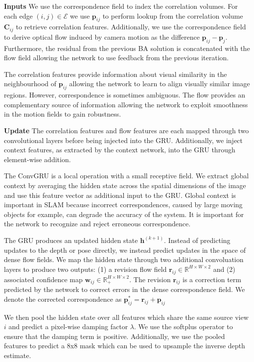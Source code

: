 \documentclass{article}
\begin{document}
\noindent \textbf{Inputs} We use the correspondence field to index the correlation volumes. For each edge $(i,j) \in \mathcal{E}$ we use $\mathbf{p}_{ij}$ to perform lookup from the correlation volume $\mathbf{C}_{ij}$ to retrieve correlation features. Additionally, we use the correspondence field to derive optical flow induced by camera motion as the difference $\mathbf{p}_{ij} - \mathbf{p}_j$. Furthermore, the residual from the previous BA solution is concatenated with the flow field allowing the network to use feedback from the previous iteration.

The correlation features provide information about visual similarity in the neighbourhood of $\mathbf{p}_{ij}$ allowing the network to learn to align visually similar image regions. However, correspondence is sometimes ambiguous. The flow provides an complementary source of information allowing the network to exploit smoothness in the motion fields to gain robustness.

\noindent \textbf{Update} The correlation features and flow features are each mapped through two convolutional layers before being injected into the GRU. Additionally, we inject context features, as extracted by the context network, into the GRU through element-wise addition.

The ConvGRU is a local operation with a small receptive field. We extract global context by averaging the hidden state across the spatial dimensions of the image and use this feature vector as additional input to the GRU. Global context is important in SLAM because incorrect correspondences, caused by large moving objects for example, can degrade the accuracy of the system. It is important for the network to recognize and reject erroneous correspondence.

The GRU produces an updated hidden state $\mathbf{h}^{(k+1)}$. Instead of predicting updates to the depth or pose directly, we instead predict updates in the space of dense flow fields. We map the hidden state through two additional convoluation layers to produce two outputs: (1) a revision flow field $\mathbf{r}_{ij} \in \mathbb{R}^{H \times W \times 2}$ and (2) associated confidence map $\mathbf{w}_{ij} \in \mathbb{R}_{+}^{H \times W \times 2}$. The revision $\mathbf{r}_{ij}$ is a correction term predicted by the network to correct errors in the dense correspondence field. We denote the corrected correspondence as $\mathbf{p}_{ij}^* = \mathbf{r}_{ij} + \mathbf{p}_{ij}$

We then pool the hidden state over all features which share the same source view $i$ and predict a pixel-wise damping factor $\lambda$. We use the softplus operator to ensure that the damping term is positive. Additionally, we use the pooled features to predict a 8x8 mask which can be used to upsample the inverse depth estimate.
\end{document}
